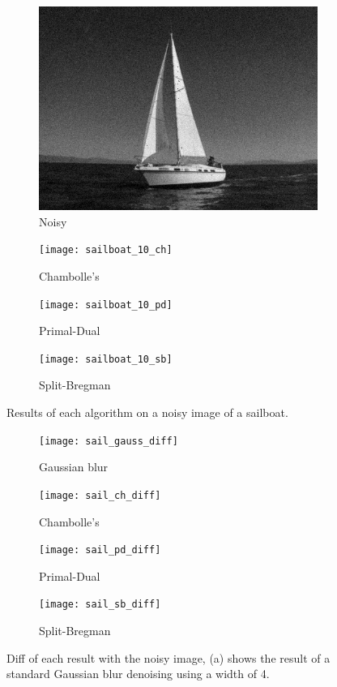 \documentclass[11pt]{article}
\begin{document}
\begin{figure}
\centering
\graphicspath{{images/}}
\begin{subfigure}[b]{0.4\textwidth}
\centering
\includegraphics[width=\textwidth]{sailboat_10}
\caption{Noisy}
\label{sail:noise}
\end{subfigure}
\begin{subfigure}[b]{0.4\textwidth}
\centering
\texttt{[image: sailboat\_10\_ch]}
\caption{Chambolle's}
\label{sail:ch}
\end{subfigure}
\begin{subfigure}[b]{0.4\textwidth}
\centering
\texttt{[image: sailboat\_10\_pd]}
\caption{Primal-Dual}
\label{sail:pd}
\end{subfigure}
\begin{subfigure}[b]{0.4\textwidth}
\centering
\texttt{[image: sailboat\_10\_sb]}
\caption{Split-Bregman}
\label{sail:sb}
\end{subfigure}
\caption{Results of each algorithm on a noisy image of a sailboat.}
\label{fig:sailboat:dn}
\end{figure}

\begin{figure}
\centering
\graphicspath{{images/}}
\begin{subfigure}[b]{0.4\textwidth}
\centering
\texttt{[image: sail\_gauss\_diff]}
\caption{Gaussian blur}
\label{sail:gauss:diff}
\end{subfigure}
\begin{subfigure}[b]{0.4\textwidth}
\centering
\texttt{[image: sail\_ch\_diff]}
\caption{Chambolle's}
\label{sail:ch:diff}
\end{subfigure}
\begin{subfigure}[b]{0.4\textwidth}
\centering
\texttt{[image: sail\_pd\_diff]}
\caption{Primal-Dual}
\label{sail:pd:diff}
\end{subfigure}
\begin{subfigure}[b]{0.4\textwidth}
\centering
\texttt{[image: sail\_sb\_diff]}
\caption{Split-Bregman}
\label{sail:sb:diff}
\end{subfigure}
\caption{Diff of each result with the noisy image, (a) shows the result of a standard Gaussian blur denoising using a width of 4.}
\label{fig:sailboat:diff}
\end{figure}





\end{document}
